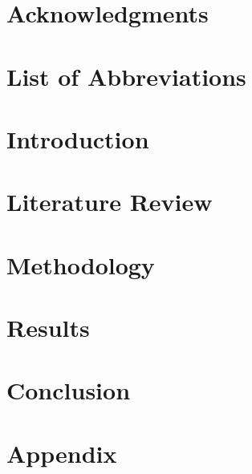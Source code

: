 \documentclass[edeposit,fullpage]{uiucthesis2018}
\begin{document}
\chapter*{Acknowledgments}



\tableofcontents
\listoftables
\listoffigures

\chapter*{List of Abbreviations}


\pagebreak
\mainmatter

\chapter{Introduction}


\chapter{Literature Review}


\chapter{Methodology}
\label{sec:methods}


\chapter{Results}


\chapter{Conclusion}


\chapter{Appendix}


\backmatter
\nocite{*}


\end{document}
